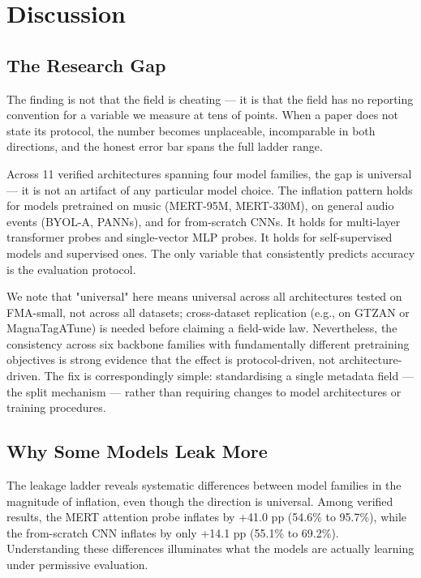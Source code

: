 \documentclass[conference]{IEEEtran}
\begin{document}
\section{Discussion}\label{discussion}

\subsection{The Research Gap}\label{a.-the-research-gap}

The finding is not that the field is cheating --- it is that the
field has no reporting convention for a variable we measure at tens of
points. When a paper does not state its protocol, the number becomes
unplaceable, incomparable in both directions, and the honest error bar
spans the full ladder range.

Across 11 verified architectures spanning four model families, the gap
is universal --- it is not an artifact of any particular model
choice. The inflation pattern holds for models pretrained on music
(MERT-95M, MERT-330M), on general audio events (BYOL-A, PANNs), and for
from-scratch CNNs. It holds for multi-layer transformer probes and
single-vector MLP probes. It holds for self-supervised models and
supervised ones. The only variable that consistently predicts accuracy
is the evaluation protocol.

We note that "universal" here means universal across all architectures
tested on FMA-small, not across all datasets; cross-dataset replication
(e.g., on GTZAN or MagnaTagATune) is needed before claiming a field-wide
law. Nevertheless, the consistency across six backbone families with
fundamentally different pretraining objectives is strong evidence that
the effect is protocol-driven, not architecture-driven. The fix is
correspondingly simple: standardising a single metadata field ---
the split mechanism --- rather than requiring changes to model
architectures or training procedures.

\subsection{Why Some Models Leak
More}\label{b.-why-some-models-leak-more}

The leakage ladder reveals systematic differences between model families
in the magnitude of inflation, even though the direction is universal.
Among verified results, the MERT attention probe inflates by +41.0 pp
(54.6\% to 95.7\%), while the from-scratch CNN inflates by only +14.1 pp
(55.1\% to 69.2\%). Understanding these differences illuminates what the
models are actually learning under permissive evaluation.
\end{document}
